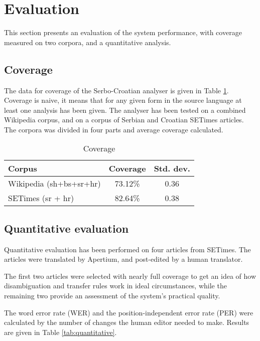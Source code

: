 \documentclass{book}
\begin{document}
\section{Evaluation}

This section presents an evaluation of the system performance, with
coverage measured on two corpora, and a quantitative analysis.

\subsection*{Coverage}

The data for coverage of the Serbo-Croatian analyser is 
given in Table \ref{tab:coverage}. Coverage is naive, 
it means that for any given form in the source language at least one analysis
has been given. The analyser has been tested on a combined Wikipedia
corpus, and on a corpus of Serbian and Croatian
SETimes articles. The corpora was divided in four parts and average 
coverage calculated.

\begin{table}
\begin{center}
\caption{Coverage}
\label{tab:coverage}
\begin{tabular}{l|c|c}
Corpus & Coverage & Std. dev. \\
\hline
Wikipedia (sh+bs+sr+hr) & 73.12\% & 0.36 \\
SETimes (sr + hr) & 82.64\% & 0.38 \\
\hline
\end{tabular}
\end{center}
\end{table}

\subsection*{Quantitative evaluation}

Quantitative evaluation has been performed on four articles from SETimes. The articles
were translated by Apertium, and post-edited by a human translator. 

The first two articles were selected with nearly full coverage to get an idea of how disambiguation 
and transfer rules work in ideal circumstances, while the remaining two
provide an assessment of the system's practical quality.

The word error rate (WER)
and the position-independent error rate (PER) were calculated by the number of changes the
human editor needed to make. 
Results are given in Table \ref{tab:quantitative}.
\end{document}
